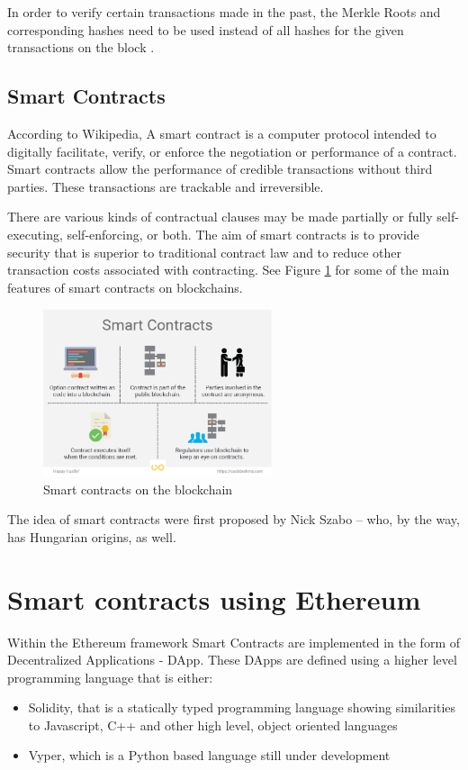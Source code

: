\documentclass[a4paper]{article}
\begin{document}
In order to verify certain transactions made in the past, the Merkle Roots and corresponding hashes need to be used instead of all hashes for the given transactions on the block \cite{IOTA_Merkle}. 



\subsection{Smart Contracts}

According to Wikipedia, \cite{Wiki_SC} A smart contract is a computer protocol intended to digitally facilitate, verify, or enforce the negotiation or performance of a contract. Smart contracts allow the performance of credible transactions without third parties. These transactions are trackable and irreversible.

There are various kinds of contractual clauses may be made partially or fully self-executing, self-enforcing, or both. The aim of smart contracts is to provide security that is superior to traditional contract law and to reduce other transaction costs associated with contracting. See Figure \ref{fig:smartcontracts} for some of the main features of smart contracts on blockchains.

\begin{figure}[H]
    \centering
    \includegraphics[width=0.6\textwidth]{figures/smart-contracts-01.png}
    \caption{Smart contracts on the blockchain}
    \label{fig:smartcontracts}
\end{figure}


The idea of smart contracts were first proposed by Nick Szabo -- who, by the way, has Hungarian origins, as well.


\section{Smart contracts using Ethereum}

Within the Ethereum framework Smart Contracts are implemented in the form of Decentralized Applications - DApp. These DApps are defined using a higher level programming language that is either:
\begin{itemize}
    \item Solidity, that is a statically typed programming language showing similarities to Javascript, C++ and other high level, object oriented languages \cite{solidity_manual}
    \item Vyper, which is a Python based language still under development \cite{vyper_doc}
\end{itemize}
\end{document}
